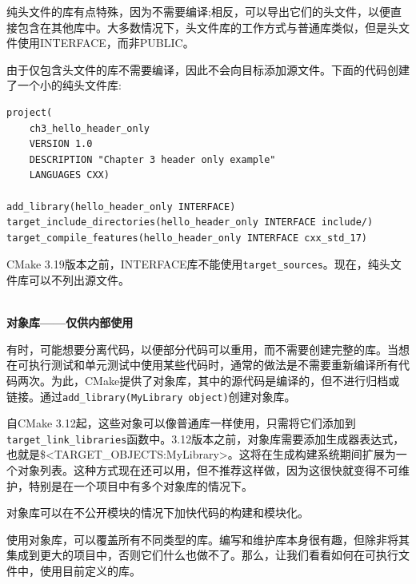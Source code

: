 
纯头文件的库有点特殊，因为不需要编译;相反，可以导出它们的头文件，以便直接包含在其他库中。大多数情况下，头文件库的工作方式与普通库类似，但是头文件使用INTERFACE，而非PUBLIC。

由于仅包含头文件的库不需要编译，因此不会向目标添加源文件。下面的代码创建了一个小的纯头文件库:

\begin{lstlisting}[style=styleCMake]
project(
	ch3_hello_header_only
	VERSION 1.0
	DESCRIPTION "Chapter 3 header only example"
	LANGUAGES CXX)

add_library(hello_header_only INTERFACE)
target_include_directories(hello_header_only INTERFACE include/)
target_compile_features(hello_header_only INTERFACE cxx_std_17)
\end{lstlisting}

CMake 3.19版本之前，INTERFACE库不能使用\texttt{target\_sources}。现在，纯头文件库可以不列出源文件。

\hspace*{\fill} \\ %
\noindent
\textbf{对象库——仅供内部使用}

有时，可能想要分离代码，以便部分代码可以重用，而不需要创建完整的库。当想在可执行测试和单元测试中使用某些代码时，通常的做法是不需要重新编译所有代码两次。为此，CMake提供了对象库，其中的源代码是编译的，但不进行归档或链接。通过\texttt{add\_library(MyLibrary object)}创建对象库。

自CMake 3.12起，这些对象可以像普通库一样使用，只需将它们添加到\texttt{target\_link\_libraries}函数中。3.12版本之前，对象库需要添加生成器表达式，也就是\$<TARGET\_OBJECTS:MyLibrary>。这将在生成构建系统期间扩展为一个对象列表。这种方式现在还可以用，但不推荐这样做，因为这很快就变得不可维护，特别是在一个项目中有多个对象库的情况下。

\begin{tcolorbox}[colback=blue!5!white,colframe=blue!75!black,title=何时使用对象库]
对象库可以在不公开模块的情况下加快代码的构建和模块化。
\end{tcolorbox}

使用对象库，可以覆盖所有不同类型的库。编写和维护库本身很有趣，但除非将其集成到更大的项目中，否则它们什么也做不了。那么，让我们看看如何在可执行文件中，使用目前定义的库。








